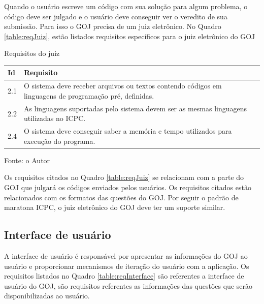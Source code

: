 Quando o usuário escreve um código com sua solução para algum problema, o código deve ser julgado e o usuário deve conseguir ver o veredito de sua submissão. Para isso o GOJ precisa de um juiz eletrônico. No Quadro \ref{table:reqJuiz}, estão listados requisitos específicos para o juiz eletrônico do GOJ

\begin{quadro}
    \caption{Requisitos do juiz}
    \centering
    \label{table:reqJuiz}
    \begin{threeparttable}
    \begin{tabular}{ |p{0.6cm}|p{11cm}|  }
        \hline
        
        \textbf{Id} & 
        \textbf{Requisito} \\
        \hline
        
        2.1 & 
        O sistema deve receber arquivos ou textos contendo códigos em linguagens de programação pré, definidas. \\ 
        \hline
        
        2.2 & 
        As linguagens suportadas pelo sistema devem ser as mesmas linguagens utilizadas no ICPC. \\
        \hline
        
        2.4 & 
        O sistema deve conseguir saber a memória e tempo utilizados para execução do programa. \\
        \hline
    \end{tabular}
    \medskip
    \begin{tablenotes}
        \centering
        \item Fonte: o Autor
    \end{tablenotes}
    \end{threeparttable}
    
\end{quadro}

Os requisitos citados no Quadro \ref{table:reqJuiz} se relacionam com a parte do GOJ que julgará os códigos enviados pelos usuários. Os requisitos citados estão relacionados com os formatos das questões do GOJ. Por seguir o padrão de maratona ICPC, o juiz eletrônico do GOJ deve ter um suporte similar.

\subsection{Interface de usuário}
\label{subsec:ui}

A interface de usuário é responsável por apresentar as informações do GOJ ao usuário e proporcionar mecanismos de iteração do usuário com a aplicação. Os requisitos listados no Quadro \ref{table:reqInterface} são referentes a interface de usuário do GOJ, são requisitos referentes as informações das questões que serão disponibilizadas ao usuário.

